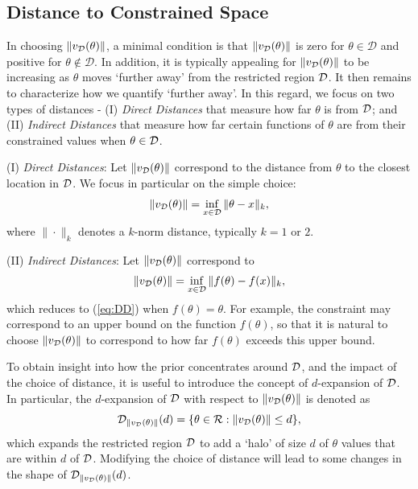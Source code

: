 \documentclass[10pt,fleqn]{article}
\DeclareMathOperator{\1}{\mathbbm{1}} \DeclareMathOperator{\bigO}{\mc O}
\begin{document}
\subsection{Distance to Constrained Space}

In choosing $\|v_{\mathcal{D}}(\theta)\|$, a minimal condition is that $\|v_{\mathcal{D}}(\theta)\|$ is zero for $\theta \in \mathcal{D}$ and positive for $\theta\not\in\mathcal{D}$. In addition, it is typically appealing for $\|v_{\mathcal{D}}(\theta)\|$ to be increasing as $\theta$ moves `further away' from the restricted region $\mathcal{D}$.
It then remains to characterize how we quantify `further away'.  In this regard, we focus on two types of distances - (I) {\em Direct Distances} that measure how far $\theta$ is from $\mathcal{D}$; and (II) {\em Indirect Distances} that measure how far certain functions of $\theta$ are from their constrained values when $\theta \in \mathcal{D}$.

(I) {\em Direct Distances}: Let $\|v_{\mathcal{D}}(\theta)\|$ correspond to the distance from $\theta$ to the closest location in $\mathcal{D}$.  We focus in particular on the simple choice: 
\begin{eqnarray}
\|v_{\mathcal{D}}(\theta)\| = \inf_{x\in\mathcal{D}} \|\theta-x\|_k,
\label{eq:DD}
\end{eqnarray}
where $\|\cdot\|_k$ denotes a $k$-norm distance, typically $k=1$ or $2$.

(II) {\em Indirect Distances}: Let $\|v_{\mathcal{D}}(\theta)\|$ correspond to 
\begin{eqnarray}
\|v_{\mathcal{D}}(\theta)\| = \inf_{x\in\mathcal{D}} \|f(\theta)-f(x)\|_k, 
\label{eq:ID}
\end{eqnarray}
which reduces to (\ref{eq:DD}) when $f(\theta)=\theta$.  For example, the constraint may correspond to an upper bound on the function $f(\theta)$, so that it is natural to choose $\|v_{\mathcal{D}}(\theta)\|$ to correspond to how far $f(\theta)$ exceeds this upper bound.  

To obtain insight into how the prior concentrates around $\mathcal{D}$, and the impact of the choice of distance, 
it is useful to introduce the concept of $d$-expansion of $\mathcal{D}$.  In particular, the $d$-expansion of $\mathcal{D}$ with respect to $\|v_{\mathcal{D}}(\theta)\|$ is denoted as 
$${\mathcal{D}}_{\|v_{\mathcal{D}}(\theta)\|}(d) = \{ \theta \in \mathcal{R}: \|v_\mathcal{D}(\theta)\| \le d \},$$
which expands the restricted region $\mathcal{D}$ to add a `halo' of size $d$ of $\theta$ values that are within $d$ of $\mathcal{D}$.  Modifying the choice of distance will lead to some changes in the shape of 
${\mathcal{D}}_{\|v_{\mathcal{D}}(\theta)\|}(d)$.
\end{document}
